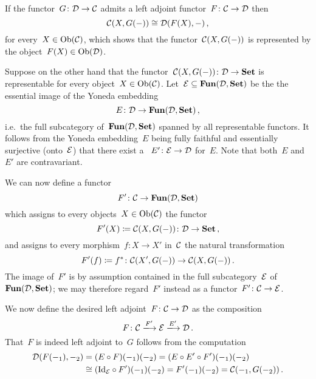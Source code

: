 \section{}

If the functor~$G \colon \mathcal{D} \to \mathcal{C}$ admits a left adjoint functor~$F \colon \mathcal{C} \to \mathcal{D}$  then
\[
        \mathcal{C}(X, G(-))
  \cong \mathcal{D}(F(X), -) \,,
\]
for every~$X \in \operatorname{Ob}(\mathcal{C})$, which shows that the functor~$\mathcal{C}(X, G(-))$ is represented by the object~$F(X) \in \operatorname{Ob}(\mathcal{D})$.

Suppose on the other hand that the functor~$\mathcal{C}(X, G(-)) \colon \mathcal{D} \to \mathbf{Set}$ is representable for every object~$X \in \operatorname{Ob}(\mathcal{C})$.
Let~$\mathcal{E} \subseteq \mathbf{Fun}(\mathcal{D}, \mathbf{Set})$ be the the essential image of the Yoneda embedding
\[
          E
  \colon  \mathcal{D}
  \to     \mathbf{Fun}(\mathcal{D}, \mathbf{Set}) \,,
\]
i.e.\ the full subcategory of~$\mathbf{Fun}(\mathcal{D}, \mathbf{Set})$ spanned by all representable functors.
It follows from the Yoneda embedding~$E$ being fully faithful and essentially surjective (onto~$\mathcal{E}$) that there exist a ~$E' \colon \mathcal{E} \to \mathcal{D}$ for~$E$.
Note that both~$E$ and~$E'$ are contravariant.

We can now define a functor
\[
          F'
  \colon  \mathcal{C}
  \to     \mathbf{Fun}(\mathcal{D}, \mathbf{Set})
\]
which assigns to every objects~$X \in \operatorname{Ob}(\mathcal{C})$ the functor
\[
            F'(X)
  \coloneqq  \mathcal{C}(X, G(-))
  \colon    \mathcal{D}
  \to       \mathbf{Set} \,,
\]
and assigns to every morphism~$f \colon X \to X'$ in~$\mathcal{C}$ the natural transformation
\[
            F'(f)
  \coloneqq  f^*
  \colon    \mathcal{C}(X', G(-))
  \to       \mathcal{C}(X, G(-)) \,.
\]
The image of~$F'$ is by assumption contained in the full subcategory~$\mathcal{E}$ of~$\mathbf{Fun}(\mathcal{D}, \mathbf{Set})$;
we may therefore regard~$F'$ instead as a functor~$F' \colon \mathcal{C} \to \mathcal{E}$.

We now define the desired left adjoint~$F \colon \mathcal{C} \to \mathcal{D}$ as the composition
\[
    F
  \colon
    \Ccat
  \xlongto{F'}
    \Ecat
  \xlongto{E'}
    \Dcat \,.
\]
That~$F$ is indeed left adjoint to~$G$ follows from the computation
\begin{align*}
          \mathcal{D}(F(-_1), -_2)
  &=      (E \circ F)(-_1)(-_2)
   =      (E \circ E' \circ F')(-_1)(-_2) \\
  &\cong  (\mathrm{Id}_{\mathcal{E}} \circ F')(-_1)(-_2)
   =      F'(-_1)(-_2)
   =      \mathcal{C}(-_1, G(-_2)) \,.
\end{align*}




